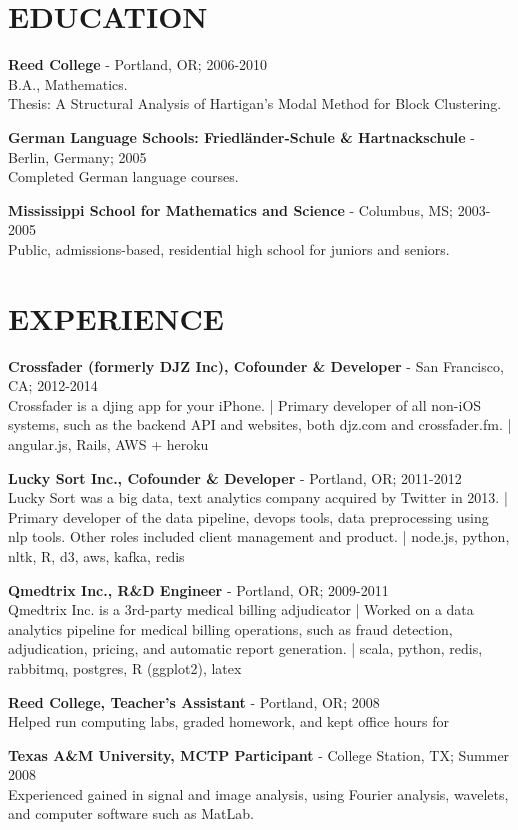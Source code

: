 \documentclass[11pt, line, margin]{res}
\newcommand{\prettysection}[1]{\setromanfont{TitilliumTitle20}\section{#1}\setromanfont{TitilliumText22L}}
\begin{document}

\begin{resume}
\prettysection{EDUCATION}
{\bf Reed College} -  Portland, OR; 2006-2010 \\ 
B.A., Mathematics. \\
Thesis: A Structural Analysis of Hartigan's Modal Method for Block
Clustering.

{\bf German Language Schools: Friedl\"{a}nder-Schule \& Hartnackschule} - Berlin, Germany; 2005 \\
Completed German language courses.

{\bf Mississippi School for Mathematics and Science} - Columbus, MS; 2003-2005 \\ 
Public, admissions-based, residential high school for juniors and seniors. 

\prettysection{EXPERIENCE}

{\bf Crossfader (formerly DJZ Inc), Cofounder \& Developer} - San Francisco, CA; 2012-2014 \\
Crossfader is a djing app for your iPhone. | Primary developer of all non-iOS systems, such as the backend
API and websites, both djz.com and crossfader.fm. | angular.js, Rails, AWS + heroku

{\bf Lucky Sort Inc., Cofounder \& Developer} - Portland, OR; 2011-2012 \\
Lucky Sort was a big data, text analytics company acquired by
Twitter in 2013. | Primary developer of the data pipeline,
devops tools, data preprocessing using nlp tools.  Other roles
included client management and product. | node.js, python, nltk, R, d3, aws, kafka, redis

{\bf Qmedtrix Inc., R\&D Engineer} - Portland, OR; 2009-2011 \\
Qmedtrix Inc. is a 3rd-party medical billing adjudicator | Worked on a
data analytics pipeline for medical billing operations, such as fraud detection, adjudication,
pricing, and automatic report generation.  | scala,
python, redis, rabbitmq, postgres, R (ggplot2), latex

{\bf Reed College, Teacher's Assistant} - Portland, OR;
2008 \\
Helped run computing labs, graded homework, and kept office hours for


{\bf Texas A\&M University, MCTP Participant} - College Station,
  TX; Summer 2008 \\
Experienced gained in signal and image analysis, using Fourier analysis, wavelets, and computer software such as
MatLab. 


\end{resume}
\end{document}
